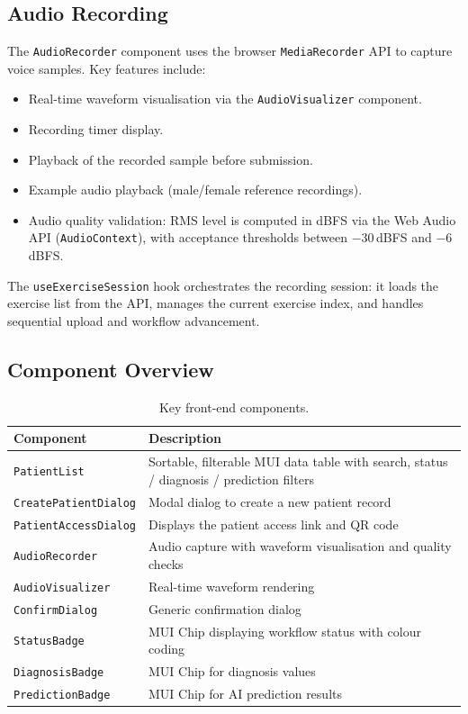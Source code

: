 \documentclass[12pt,a4paper]{article}
\begin{document}
\subsection{Audio Recording}

The \texttt{AudioRecorder} component uses the browser \texttt{MediaRecorder} API
to capture voice samples. Key features include:

\begin{itemize}[nosep]
  \item Real-time waveform visualisation via the \texttt{AudioVisualizer}
    component.
  \item Recording timer display.
  \item Playback of the recorded sample before submission.
  \item Example audio playback (male/female reference recordings).
  \item Audio quality validation: RMS level is computed in dBFS via the Web
    Audio API (\texttt{AudioContext}), with acceptance thresholds between
    $-30$\,dBFS and $-6$\,dBFS.
\end{itemize}

The \texttt{useExerciseSession} hook orchestrates the recording session: it
loads the exercise list from the API, manages the current exercise index, and
handles sequential upload and workflow advancement.

\subsection{Component Overview}

\begin{table}[H]
\centering
\caption{Key front-end components.}
\label{tab:components}
\begin{tabularx}{\textwidth}{l X}
\toprule
\textbf{Component} & \textbf{Description} \\
\midrule
\texttt{PatientList}         & Sortable, filterable MUI data table with search, status / diagnosis / prediction filters \\
\texttt{CreatePatientDialog} & Modal dialog to create a new patient record \\
\texttt{PatientAccessDialog} & Displays the patient access link and QR code \\
\texttt{AudioRecorder}       & Audio capture with waveform visualisation and quality checks \\
\texttt{AudioVisualizer}     & Real-time waveform rendering \\
\texttt{ConfirmDialog}       & Generic confirmation dialog \\
\texttt{StatusBadge}         & MUI Chip displaying workflow status with colour coding \\
\texttt{DiagnosisBadge}      & MUI Chip for diagnosis values \\
\texttt{PredictionBadge}     & MUI Chip for AI prediction results \\
\bottomrule
\end{tabularx}
\end{table}
\end{document}
